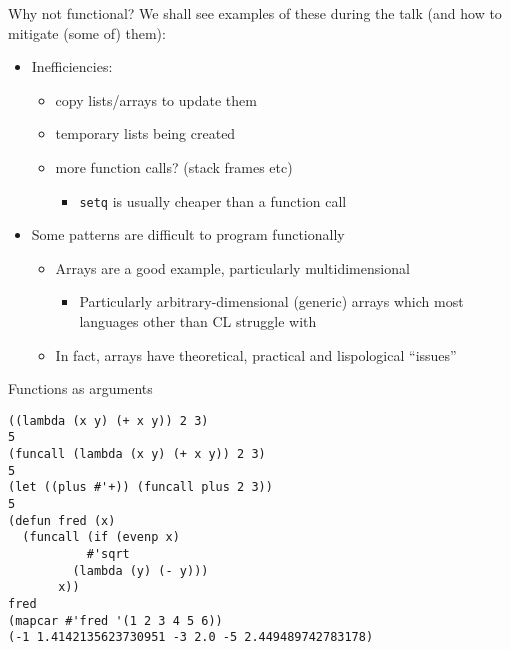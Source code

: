 \documentclass[presentation]{beamer}
\begin{document}
\begin{frame}{Why not functional?}
We shall see examples of these during the talk (and how to mitigate (some of) them):
  \begin{itemize}
  \item Inefficiencies:
    \begin{itemize}
    \item copy lists/arrays to update them
    \item temporary lists being created
    \item more function calls? (stack frames etc)
      \begin{itemize}
      \item \texttt{setq} is usually cheaper than a function call
      \end{itemize}
    \end{itemize}
  \item Some patterns are difficult to program functionally
    \begin{itemize}
    \item Arrays are a good example, particularly multidimensional
      \begin{itemize}
      \item Particularly arbitrary-dimensional (generic) arrays which most languages other than CL struggle with
      \end{itemize}
    \item In fact, arrays have theoretical, practical and lispological ``issues''
    \end{itemize}
  \end{itemize}
\end{frame}

\begin{frame}[fragile]{Functions as arguments}
\begin{verbatim}
((lambda (x y) (+ x y)) 2 3)
5
(funcall (lambda (x y) (+ x y)) 2 3)
5
(let ((plus #'+)) (funcall plus 2 3))
5
(defun fred (x)
  (funcall (if (evenp x)
	       #'sqrt
	     (lambda (y) (- y)))
	   x))
fred
(mapcar #'fred '(1 2 3 4 5 6))
(-1 1.4142135623730951 -3 2.0 -5 2.449489742783178)
\end{verbatim}
\end{frame}
\end{document}
